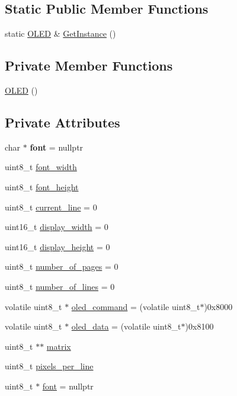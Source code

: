 \subsection*{Static Public Member Functions}
\begin{DoxyCompactItemize}
\item 
static \hyperlink{class_o_l_e_d}{O\+L\+ED} \& \hyperlink{class_o_l_e_d_a7b261492679b5e67d346e97ed575332e}{Get\+Instance} ()
\end{DoxyCompactItemize}
\subsection*{Private Member Functions}
\begin{DoxyCompactItemize}
\item 
\hyperlink{class_o_l_e_d_a8eabf371b5642d99800adb759dab27fd}{O\+L\+ED} ()
\end{DoxyCompactItemize}
\subsection*{Private Attributes}
\begin{DoxyCompactItemize}
\item 
char $\ast$ {\bfseries font} = nullptr\hypertarget{class_o_l_e_d_a5bb36d22f2c4f536ff0e456af496291c}{}\label{class_o_l_e_d_a5bb36d22f2c4f536ff0e456af496291c}

\item 
uint8\+\_\+t \hyperlink{class_o_l_e_d_a3c9ea103adf6c860a2534135e9a25ba8}{font\+\_\+width}
\item 
uint8\+\_\+t \hyperlink{class_o_l_e_d_a85b91421932866dea031921799ba83a3}{font\+\_\+height}
\item 
uint8\+\_\+t \hyperlink{class_o_l_e_d_aebd62601be5e2ceef6295721f17fc013}{current\+\_\+line} = 0
\item 
uint16\+\_\+t \hyperlink{class_o_l_e_d_ae88ab3d6d63a7ead982a3b7cc673eefe}{display\+\_\+width} = 0
\item 
uint16\+\_\+t \hyperlink{class_o_l_e_d_aa14ebb59666d7822288115a04ac0a34b}{display\+\_\+height} = 0
\item 
uint8\+\_\+t \hyperlink{class_o_l_e_d_aaac99b0eb4e9dfe92b8571488dc89288}{number\+\_\+of\+\_\+pages} = 0
\item 
uint8\+\_\+t \hyperlink{class_o_l_e_d_a9ea1c55112deede1a61142af276a6bc9}{number\+\_\+of\+\_\+lines} = 0
\item 
volatile uint8\+\_\+t $\ast$ \hyperlink{class_o_l_e_d_af0a85ccd0274347b8c1ac77d298a14cf}{oled\+\_\+command} = (volatile uint8\+\_\+t$\ast$)0x8000
\item 
volatile uint8\+\_\+t $\ast$ \hyperlink{class_o_l_e_d_a1bc54d49808f92ddfc354511b692df6f}{oled\+\_\+data} = (volatile uint8\+\_\+t$\ast$)0x8100
\item 
uint8\+\_\+t $\ast$$\ast$ \hyperlink{class_o_l_e_d_a9d32e21189940afba24deab0a2bc0126}{matrix}
\item 
uint8\+\_\+t \hyperlink{class_o_l_e_d_a6ddac7b826eccac8c682c5246ef52b29}{pixels\+\_\+per\+\_\+line}
\item 
uint8\+\_\+t $\ast$ \hyperlink{class_o_l_e_d_a29ab86a4a73f4d343bf1810927f0911d}{font} = nullptr
\end{DoxyCompactItemize}


